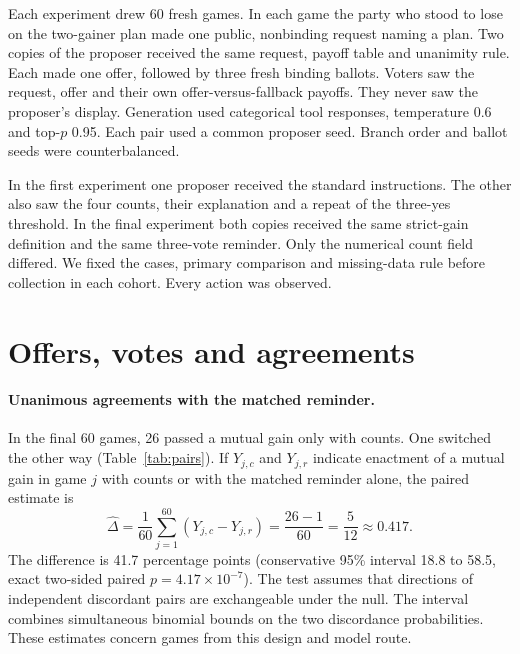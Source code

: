 \documentclass[11pt]{article}
\begin{document}
Each experiment drew 60 fresh games. In each game the party who stood to lose on the two-gainer plan made one public, nonbinding request naming a plan. Two copies of the proposer received the same request, payoff table and unanimity rule. Each made one offer, followed by three fresh binding ballots. Voters saw the request, offer and their own offer-versus-fallback payoffs. They never saw the proposer's display. Generation used categorical tool responses, temperature 0.6 and top-\(p\) 0.95. Each pair used a common proposer seed. Branch order and ballot seeds were counterbalanced.

In the first experiment one proposer received the standard instructions. The other also saw the four counts, their explanation and a repeat of the three-yes threshold. In the final experiment both copies received the same strict-gain definition and the same three-vote reminder. Only the numerical count field differed. We fixed the cases, primary comparison and missing-data rule before collection in each cohort. Every action was observed.

\section{Offers, votes and agreements}

\paragraph{Unanimous agreements with the matched reminder.} In the final 60 games, 26 passed a mutual gain only with counts. One switched the other way (Table~\ref{tab:pairs}). If \(Y_{j,c}\) and \(Y_{j,r}\) indicate enactment of a mutual gain in game \(j\) with counts or with the matched reminder alone, the paired estimate is
\begin{equation}
\widehat{\Delta}=\frac{1}{60}\sum_{j=1}^{60}(Y_{j,c}-Y_{j,r})
=\frac{26-1}{60}=\frac{5}{12}\approx 0.417 .
\label{eq:paired}
\end{equation}
The difference is 41.7 percentage points (conservative 95\% interval 18.8 to 58.5, exact two-sided paired \(p=4.17\times10^{-7}\)). The test assumes that directions of independent discordant pairs are exchangeable under the null. The interval combines simultaneous binomial bounds on the two discordance probabilities. These estimates concern games from this design and model route.
\end{document}
